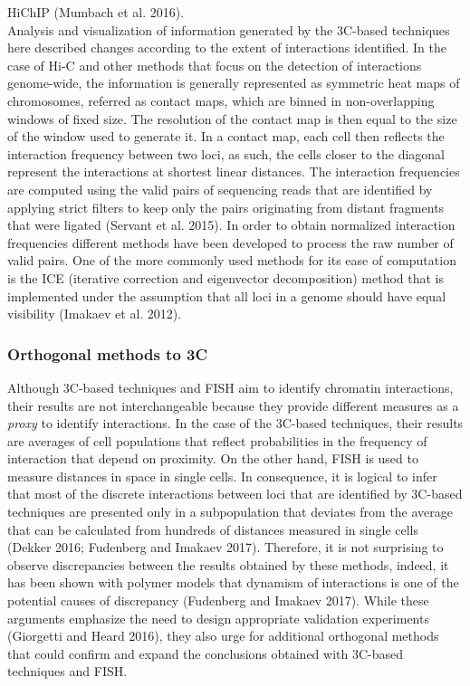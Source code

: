 HiChIP (Mumbach et al. 2016).\\

Analysis and visualization of information generated by the 3C-based techniques here described changes according to the extent of interactions identified. In the case of Hi-C and other methods that focus on the detection of interactions genome-wide, the information is generally represented as symmetric heat maps of chromosomes, referred as contact maps, which are binned in non-overlapping windows of fixed size. The resolution of the contact map is then equal to the size of the window used to generate it. In a contact map, each cell then reflects the interaction frequency between two loci, as such, the cells closer to the diagonal represent the interactions at shortest linear distances. The interaction frequencies are computed using the valid pairs of sequencing reads that are identified by applying strict filters to keep only the pairs originating from distant fragments that were ligated (Servant et al. 2015). In order to obtain normalized interaction frequencies different methods have been developed to process the raw number of valid pairs. One of the more commonly used methods for its ease of computation is the ICE (iterative correction and eigenvector decomposition) method that is implemented under the assumption that all loci in a genome should have equal visibility (Imakaev et al. 2012).\\

		\subsubsection{Orthogonal methods to 3C}

Although 3C-based techniques and FISH aim to identify chromatin interactions, their results are not interchangeable because they provide different measures as a \textit{proxy} to identify interactions. In the case of the 3C-based techniques, their results are averages of cell populations that reflect probabilities in the frequency of interaction that depend on proximity. On the other hand, FISH is used to measure distances in space in single cells. In consequence, it is logical to infer that most of the discrete interactions between loci that are identified by 3C-based techniques are presented only in a subpopulation that deviates from the average that can be calculated from hundreds of distances measured in single cells (Dekker 2016; Fudenberg and Imakaev 2017). Therefore, it is not surprising to observe discrepancies between the results obtained by these methods, indeed, it has been shown with polymer models that dynamism of interactions is one of the potential causes of discrepancy (Fudenberg and Imakaev 2017). While these arguments emphasize the need to design appropriate validation experiments (Giorgetti and Heard 2016), they also urge for additional orthogonal methods that could confirm and expand the conclusions obtained with 3C-based techniques and FISH.\\

